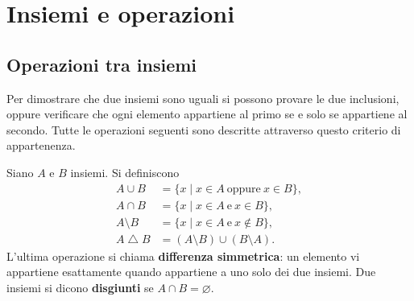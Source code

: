 \chapter{Insiemi e operazioni}

\section{Operazioni tra insiemi}
Per dimostrare che due insiemi sono uguali si possono provare le due inclusioni, oppure verificare che ogni elemento appartiene al primo se e solo se appartiene al secondo. Tutte le operazioni seguenti sono descritte attraverso questo criterio di appartenenza.

\begin{definizione}
Siano $A$ e $B$ insiemi. Si definiscono
\[
\begin{aligned}
A\cup B&=\{x\mid x\in A\ \text{oppure}\ x\in B\},\\
A\cap B&=\{x\mid x\in A\ \text{e}\ x\in B\},\\
A\setminus B&=\{x\mid x\in A\ \text{e}\ x\notin B\},\\
A\mathbin\triangle B&=(A\setminus B)\cup(B\setminus A).
\end{aligned}
\]
L'ultima operazione si chiama \textbf{differenza simmetrica}: un elemento vi appartiene esattamente quando appartiene a uno solo dei due insiemi. Due insiemi si dicono \textbf{disgiunti} se $A\cap B=\varnothing$.
\end{definizione}

\begin{schema}
\end{schema}

